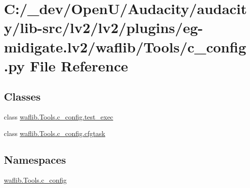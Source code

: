\hypertarget{lv2_2plugins_2eg-midigate_8lv2_2waflib_2_tools_2c__config_8py}{}\section{C\+:/\+\_\+dev/\+Open\+U/\+Audacity/audacity/lib-\/src/lv2/lv2/plugins/eg-\/midigate.lv2/waflib/\+Tools/c\+\_\+config.py File Reference}
\label{lv2_2plugins_2eg-midigate_8lv2_2waflib_2_tools_2c__config_8py}
\subsection*{Classes}
\begin{DoxyCompactItemize}
\item 
class \hyperlink{classwaflib_1_1_tools_1_1c__config_1_1test__exec}{waflib.\+Tools.\+c\+\_\+config.\+test\+\_\+exec}
\item 
class \hyperlink{classwaflib_1_1_tools_1_1c__config_1_1cfgtask}{waflib.\+Tools.\+c\+\_\+config.\+cfgtask}
\end{DoxyCompactItemize}
\subsection*{Namespaces}
\begin{DoxyCompactItemize}
\item 
 \hyperlink{namespacewaflib_1_1_tools_1_1c__config}{waflib.\+Tools.\+c\+\_\+config}
\end{DoxyCompactItemize}
